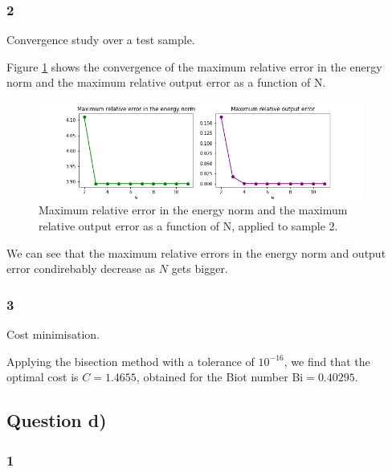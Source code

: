 \documentclass[
	english,
	11pt, %
]{fphw}
\newcommand{\bi}{\text{Bi}}
\begin{document}
\subsubsection*{2}
\begin{problem}
	Convergence study over a test sample.
\end{problem}

Figure \cref{fig:sample2Error} shows the convergence of the maximum
relative error in the energy norm and the maximum relative
output error as a function of N.

\begin{figure}[H]
	\centering
	\includegraphics[width=0.95\textwidth]{sample2Error.png}
	\caption{Maximum relative error in the energy norm and the maximum relative output error as a function of N, applied to sample 2.}
	\label{fig:sample2Error}
\end{figure}

We can see that the maximum relative errors in the energy norm and output error condirebably decrease as $N$ gets bigger.


\subsubsection*{3}
\begin{problem}
	Cost minimisation.
\end{problem}

Applying the bisection method with a tolerance of $10^{-16}$, we find that the optimal cost is $C=1.4655$, obtained for the Biot number $\bi = 0.40295$.

\subsection*{Question d)}
\subsubsection*{1}
\end{document}
